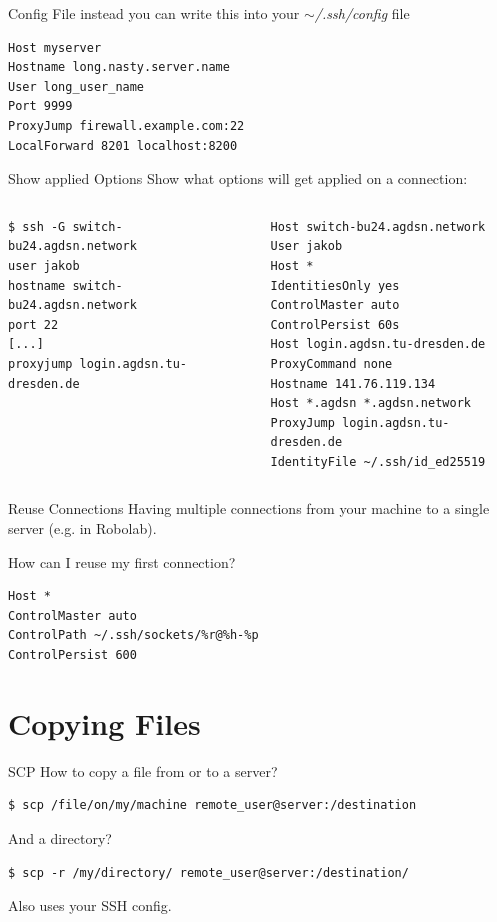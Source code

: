 \documentclass[10pt,graphics,aspectratio=169,table]{beamer}
\begin{document}
\begin{frame}[fragile]{Config File}
instead you can write this into your \textit{$\sim$/.ssh/config} file
\begin{lstlisting}
Host myserver
Hostname long.nasty.server.name
User long_user_name
Port 9999
ProxyJump firewall.example.com:22
LocalForward 8201 localhost:8200
\end{lstlisting}
\end{frame}

\begin{frame}[fragile]{Show applied Options}
Show what options will get applied on a connection:
\begin{columns}
    \begin{column}{0.5\textwidth}
        \begin{lstlisting}
$ ssh -G switch-bu24.agdsn.network
user jakob
hostname switch-bu24.agdsn.network
port 22
[...]
proxyjump login.agdsn.tu-dresden.de
    \end{lstlisting}
\end{column}
    \begin{column}{0.5\textwidth}
        \begin{lstlisting}
Host switch-bu24.agdsn.network
User jakob
Host *
IdentitiesOnly yes
ControlMaster auto
ControlPersist 60s
Host login.agdsn.tu-dresden.de
ProxyCommand none
Hostname 141.76.119.134
Host *.agdsn *.agdsn.network
ProxyJump login.agdsn.tu-dresden.de
IdentityFile ~/.ssh/id_ed25519
        \end{lstlisting}
    \end{column}
    \end{columns}
\end{frame}

\begin{frame}[fragile]{Reuse Connections}
Having multiple connections from your machine to a single server (e.g. in Robolab).

How can I reuse my first connection?
\begin{lstlisting}
Host *
ControlMaster auto
ControlPath ~/.ssh/sockets/%r@%h-%p
ControlPersist 600
\end{lstlisting}
\end{frame}

\section{Copying Files}
\begin{frame}[fragile]{SCP}
How to copy a file from or to a server?
\begin{lstlisting}
$ scp /file/on/my/machine remote_user@server:/destination
\end{lstlisting}
And a directory?
\begin{lstlisting}
$ scp -r /my/directory/ remote_user@server:/destination/
\end{lstlisting}
Also uses your SSH config.
\end{frame}
\end{document}
